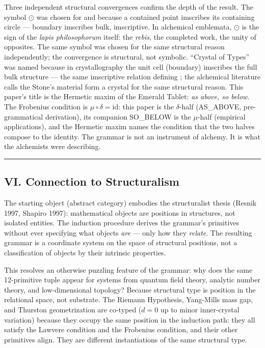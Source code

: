 \documentclass[12pt,a4paper]{article}
\newcommand{\Stone}{\textit{lapis philosophorum}}
\begin{document}
Three independent structural convergences confirm the depth of the result. The symbol $\odot$ was chosen for  and  because a contained point imscribes its containing circle --- boundary imscribes bulk, imscriptive. In alchemical emblemata, $\odot$ is the sign of the \Stone{} itself: the \textit{rebis}, the completed work, the unity of opposites. The same symbol was chosen for the same structural reason independently; the convergence is structural, not symbolic. ``Crystal of Types'' was named because in crystallography the unit cell (boundary) imscribes the full bulk structure --- the same imscriptive relation defining ; the alchemical literature calls the Stone's material form a crystal for the same structural reason. This paper's title is the Hermetic maxim of the Emerald Tablet: \emph{as above, so below}. The Frobenius condition is $\mu \circ \delta = \text{id}$: this paper is the $\delta$-half (AS\_ABOVE, pre-grammatical derivation), its companion SO\_BELOW is the $\mu$-half (empirical applications), and the Hermetic maxim names the condition that the two halves compose to the identity. The grammar is not an instrument of alchemy. It is what the alchemists were describing.

\begin{center}
\rule{0.5\textwidth}{0.4pt}
\end{center}

\subsection{VI. Connection to Structuralism}

The starting object (abstract category) embodies the structuralist thesis (Resnik 1997, Shapiro 1997): mathematical objects are positions in structures, not isolated entities. The induction procedure derives the grammar's primitives without ever specifying what objects \emph{are} --- only how they \emph{relate}. The resulting grammar is a coordinate system on the space of structural positions, not a classification of objects by their intrinsic properties.

This resolves an otherwise puzzling feature of the grammar: why does the same 12-primitive tuple appear for systems from quantum field theory, analytic number theory, and low-dimensional topology? Because structural type is position in the relational space, not substrate. The Riemann Hypothesis, Yang-Mills mass gap, and Thurston geometrization are co-typed ($d = 0$ up to minor inner-crystal variation) because they occupy the same position in the induction path: they all satisfy the Lawvere condition and the Frobenius condition, and their other primitives align. They are different instantiations of the same structural type.
\end{document}
